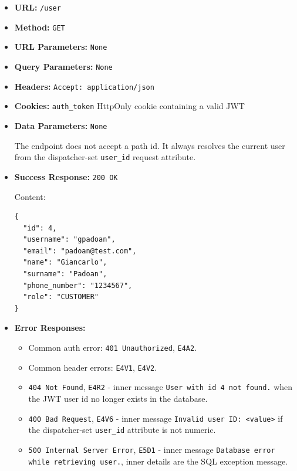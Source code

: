 \begin{itemize}[nosep]
\item \textbf{URL:} \texttt{/user}

\item \textbf{Method:} \texttt{GET}

\item \textbf{URL Parameters:} \texttt{None}

\item \textbf{Query Parameters:} \texttt{None}

\item \textbf{Headers:} \texttt{Accept: application/json}

\item \textbf{Cookies:} \texttt{auth\_token} HttpOnly cookie containing a valid JWT

\item \textbf{Data Parameters:} \texttt{None}

The endpoint does not accept a path id. It always resolves the current user from the dispatcher-set \texttt{user\_id} request attribute.

\item \textbf{Success Response:} \texttt{200 OK}

Content:

\begin{lstlisting}
{
  "id": 4,
  "username": "gpadoan",
  "email": "padoan@test.com",
  "name": "Giancarlo",
  "surname": "Padoan",
  "phone_number": "1234567",
  "role": "CUSTOMER"
}
\end{lstlisting}

\item \textbf{Error Responses:}

\begin{itemize}[nosep]
\item Common auth error: \texttt{401 Unauthorized}, \texttt{E4A2}.
\item Common header errors: \texttt{E4V1}, \texttt{E4V2}.
\item \texttt{404 Not Found}, \texttt{E4R2} - inner message \texttt{User with id 4 not found.} when the JWT user id no longer exists in the database.
\item \texttt{400 Bad Request}, \texttt{E4V6} - inner message \texttt{Invalid user ID: <value>} if the dispatcher-set \texttt{user\_id} attribute is not numeric.
\item \texttt{500 Internal Server Error}, \texttt{E5D1} - inner message \texttt{Database error while retrieving user.}, inner details are the SQL exception message.
\end{itemize}

\end{itemize}

